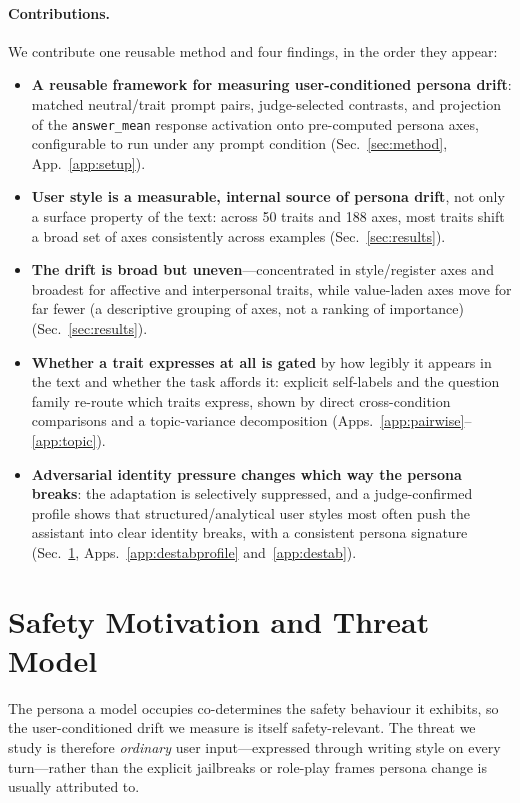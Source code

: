 \documentclass{article}
\newcommand{\ax}[1]{\texttt{#1}}   %
\begin{document}
\paragraph{Contributions.}
We contribute one reusable method and four findings, in the order they appear:
\begin{itemize}[leftmargin=1.4em, itemsep=2.5pt]
\item \textbf{A reusable framework for measuring user-conditioned persona drift}: matched neutral/trait prompt pairs, judge-selected contrasts, and projection of the \ax{answer\_mean} response activation onto pre-computed persona axes, configurable to run under any prompt condition (Sec.~\ref{sec:method}, App.~\ref{app:setup}).
\item \textbf{User style is a measurable, internal source of persona drift}, not only a surface property of the text: across 50 traits and 188 axes, most traits shift a broad set of axes consistently across examples (Sec.~\ref{sec:results}).
\item \textbf{The drift is broad but uneven}---concentrated in style/register axes and broadest for affective and interpersonal traits, while value-laden axes move for far fewer (a descriptive grouping of axes, not a ranking of importance) (Sec.~\ref{sec:results}).
\item \textbf{Whether a trait expresses at all is gated} by how legibly it appears in the text and whether the task affords it: explicit self-labels and the question family re-route which traits express, shown by direct cross-condition comparisons and a topic-variance decomposition (Apps.~\ref{app:pairwise}--\ref{app:topic}).
\item \textbf{Adversarial identity pressure changes which way the persona breaks}: the adaptation is selectively suppressed, and a judge-confirmed profile shows that structured/analytical user styles most often push the assistant into clear identity breaks, with a consistent persona signature (Sec.~\ref{sec:safety}, Apps.~\ref{app:destabprofile} and~\ref{app:destab}).
\end{itemize}

\section{Safety Motivation and Threat Model}
\label{sec:safety}

The persona a model occupies co-determines the safety behaviour it exhibits, so the user-conditioned drift we measure is itself safety-relevant. The threat we study is therefore \emph{ordinary} user input---expressed through writing style on every turn---rather than the explicit jailbreaks or role-play frames persona change is usually attributed to.
\end{document}
